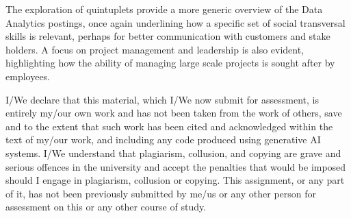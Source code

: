 \documentclass{article}
\begin{document}
The exploration of quintuplets provide a more generic overview of the Data Analytics postings, once again underlining how a specific set of social transversal skills is relevant, perhaps for better communication with customers and stake holders.
A focus on project management and leadership is also evident, highlighting how the ability of managing large scale projects is sought after by employees.

\newpage

I/We declare that this material, which I/We now submit for assessment, is entirely my/our own work and has not been taken from the work of others, save and to the extent that such work has been cited and acknowledged within the text of my/our work, and including any code produced using generative AI systems. I/We understand that plagiarism, collusion, and copying are grave and serious offences in the university and accept the penalties that would be imposed should I engage in plagiarism, collusion or copying. This assignment, or any part of it, has not been previously submitted by me/us or any other person for assessment on this or any other course of study.
\end{document}
